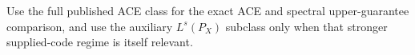 Use the full published ACE class for the exact ACE and spectral upper-guarantee comparison, and use the auxiliary \(L^s(P_X)\) subclass only when that stronger supplied-code regime is itself relevant.